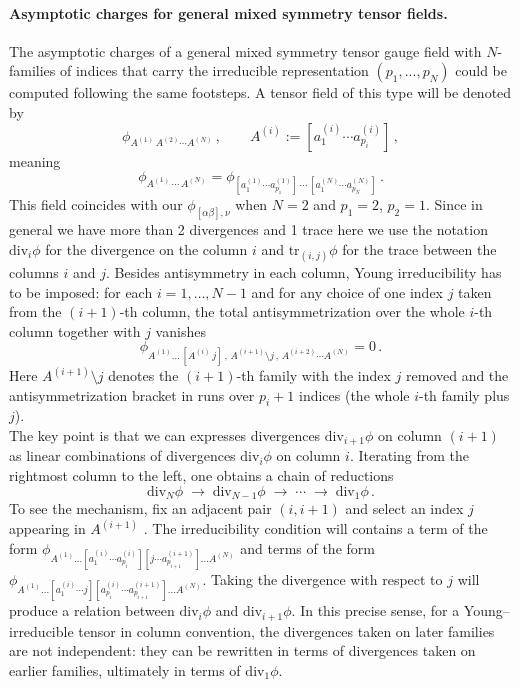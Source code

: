 \documentclass[a4paper,12pt]{article}
\begin{document}
\paragraph{Asymptotic charges for general mixed symmetry tensor fields.} The asymptotic charges of a general mixed symmetry tensor gauge field with $N$-families of indices that carry the irreducible representation $(p_1,...,p_N)$ could be computed following the same footsteps. A tensor field of this type will be denoted by
\begin{equation}
    \phi_{A^{(1)}\, A^{(2)} \cdots A^{(N)}} \, , 
\qquad 
A^{(i)} := [a^{(i)}_1 \cdots a^{(i)}_{p_i}] \, ,
\end{equation}
meaning
\begin{equation}
    \phi_{A^{(1)}\,\cdots\,A^{(N)}} 
= \phi_{[a^{(1)}_1 \cdots a^{(1)}_{p_1}] \, \cdots \, [a^{(N)}_1 \cdots a^{(N)}_{p_N}]} \, .
\end{equation}
This field coincides with our $\phi_{[\alpha \beta],\nu}$ when $N=2$ and $p_1=2$, $p_2=1$. Since in general we have more than 2 divergences and 1 trace here we use the notation $\mathrm{div}_i \phi$ for the divergence on the column $i$ and $\mathrm{tr}_{(i,j)} \phi$ for the trace between the columns $i$ and $j$.
Besides antisymmetry in each column, Young irreducibility has to be imposed: for each $i=1,\dots,N-1$ and for any choice of one index $j$ taken from the $(i+1)$-th column, the total antisymmetrization over the whole $i$-th column together with $j$ vanishes
\begin{equation}
\phi_{A^{(1)}...\,[A^{(i)} \, j] \, , \, A^{(i+1)} \setminus j \, , \, A^{(i+2)} \cdots A^{(N)}} = 0 \, .
\label{young}
\end{equation}
Here $A^{(i+1)} \setminus j$ denotes the $(i+1)$-th family with the index $j$ removed and the antisymmetrization bracket in runs over $p_i+1$ indices (the whole $i$-th family plus $j$).\\ 
The key point is that we can expresses divergences $\mathrm{div}_{i+1}\phi$ on column $(i+1)$ as linear combinations of divergences $\mathrm{div}_{i}\phi$ on column $i$. Iterating from the rightmost column to the left, one obtains a chain of reductions
\begin{equation}
    \mathrm{div}_{N}\phi \;\longrightarrow\; \mathrm{div}_{N-1}\phi \;\longrightarrow\; \cdots \;\longrightarrow\; \mathrm{div}_{1}\phi \, .
\end{equation} 
To see the mechanism, fix an adjacent pair $(i,i+1)$ and select an index $j$ appearing in $A^{(i+1)}$ . The irreducibility condition will contains a term of the form $\phi_{A^{(1)}...[a^{(i)}_1 \cdots a^{(i)}_{p_i}] [j \cdots a^{(i+1)}_{p_{i+1}}]...A^{(N)}} $ and terms of the form $\phi_{A^{(1)}...[a^{(i)}_1 \cdots j] [a^{(i)}_{p_i} \cdots a^{(i+1)}_{p_{i+1}}]...A^{(N)}}$. Taking the divergence with respect to $j$ will produce a relation between $\mathrm{div}_{i}\phi$ and $\mathrm{div}_{i+1}\phi$. In this precise sense, for a Young--irreducible tensor in column convention, the divergences taken on later families are not independent: they can be rewritten in terms of divergences taken on earlier families, ultimately in terms of $\mathrm{div}_1\phi$.\\ 
\end{document}
